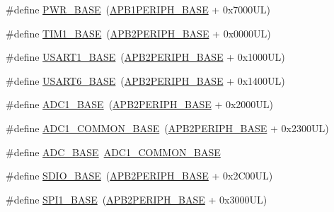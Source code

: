 \begin{DoxyCompactItemize}
\item 
\#define \hyperlink{group___peripheral__memory__map_gac691ec23dace8b7a649a25acb110217a}{P\+W\+R\+\_\+\+B\+A\+SE}~(\hyperlink{group___peripheral__memory__map_ga45666d911f39addd4c8c0a0ac3388cfb}{A\+P\+B1\+P\+E\+R\+I\+P\+H\+\_\+\+B\+A\+SE} + 0x7000\+U\+L)
\item 
\#define \hyperlink{group___peripheral__memory__map_gaf8aa324ca5011b8173ab16585ed7324a}{T\+I\+M1\+\_\+\+B\+A\+SE}~(\hyperlink{group___peripheral__memory__map_ga25b99d6065f1c8f751e78f43ade652cb}{A\+P\+B2\+P\+E\+R\+I\+P\+H\+\_\+\+B\+A\+SE} + 0x0000\+U\+L)
\item 
\#define \hyperlink{group___peripheral__memory__map_ga86162ab3f740db9026c1320d46938b4d}{U\+S\+A\+R\+T1\+\_\+\+B\+A\+SE}~(\hyperlink{group___peripheral__memory__map_ga25b99d6065f1c8f751e78f43ade652cb}{A\+P\+B2\+P\+E\+R\+I\+P\+H\+\_\+\+B\+A\+SE} + 0x1000\+U\+L)
\item 
\#define \hyperlink{group___peripheral__memory__map_gade4d3907fd0387ee832f426f52d568bb}{U\+S\+A\+R\+T6\+\_\+\+B\+A\+SE}~(\hyperlink{group___peripheral__memory__map_ga25b99d6065f1c8f751e78f43ade652cb}{A\+P\+B2\+P\+E\+R\+I\+P\+H\+\_\+\+B\+A\+SE} + 0x1400\+U\+L)
\item 
\#define \hyperlink{group___peripheral__memory__map_ga695c9a2f892363a1c942405c8d351b91}{A\+D\+C1\+\_\+\+B\+A\+SE}~(\hyperlink{group___peripheral__memory__map_ga25b99d6065f1c8f751e78f43ade652cb}{A\+P\+B2\+P\+E\+R\+I\+P\+H\+\_\+\+B\+A\+SE} + 0x2000\+U\+L)
\item 
\#define \hyperlink{group___peripheral__memory__map_ga1ef44c8e4398bd3b3fbb0c981657f3d0}{A\+D\+C1\+\_\+\+C\+O\+M\+M\+O\+N\+\_\+\+B\+A\+SE}~(\hyperlink{group___peripheral__memory__map_ga25b99d6065f1c8f751e78f43ade652cb}{A\+P\+B2\+P\+E\+R\+I\+P\+H\+\_\+\+B\+A\+SE} + 0x2300\+U\+L)
\item 
\#define \hyperlink{group___peripheral__memory__map_gad06cb9e5985bd216a376f26f22303cd6}{A\+D\+C\+\_\+\+B\+A\+SE}~\hyperlink{group___peripheral__memory__map_ga1ef44c8e4398bd3b3fbb0c981657f3d0}{A\+D\+C1\+\_\+\+C\+O\+M\+M\+O\+N\+\_\+\+B\+A\+SE}
\item 
\#define \hyperlink{group___peripheral__memory__map_ga95dd0abbc6767893b4b02935fa846f52}{S\+D\+I\+O\+\_\+\+B\+A\+SE}~(\hyperlink{group___peripheral__memory__map_ga25b99d6065f1c8f751e78f43ade652cb}{A\+P\+B2\+P\+E\+R\+I\+P\+H\+\_\+\+B\+A\+SE} + 0x2\+C00\+U\+L)
\item 
\#define \hyperlink{group___peripheral__memory__map_ga50cd8b47929f18b05efbd0f41253bf8d}{S\+P\+I1\+\_\+\+B\+A\+SE}~(\hyperlink{group___peripheral__memory__map_ga25b99d6065f1c8f751e78f43ade652cb}{A\+P\+B2\+P\+E\+R\+I\+P\+H\+\_\+\+B\+A\+SE} + 0x3000\+U\+L)

\end{DoxyCompactItemize}
